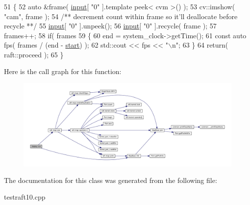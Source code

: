 \begin{DoxyCode}
51    \{
52       \textcolor{keyword}{auto} &frame( \hyperlink{classraft_1_1kernel_a6edbe35a56409d402e719b3ac36d6554}{input}[ \textcolor{stringliteral}{"0"} ].\textcolor{keyword}{template} peek< cvm >() );
53       cv::imshow( \textcolor{stringliteral}{"cam"}, frame );\textcolor{comment}{}
54 \textcolor{comment}{      /** decrement count within frame so it'll deallocate before recycle **/}
55       \hyperlink{classraft_1_1kernel_a6edbe35a56409d402e719b3ac36d6554}{input}[ \textcolor{stringliteral}{"0"} ].unpeek();
56       \hyperlink{classraft_1_1kernel_a6edbe35a56409d402e719b3ac36d6554}{input}[ \textcolor{stringliteral}{"0"} ].recycle( frame );
57       frames++;
58       \textcolor{keywordflow}{if}( frames %
59       \{
60          end = system\_clock->getTime();
61          \textcolor{keyword}{const} \textcolor{keyword}{auto} fps( frames / (end - \hyperlink{classstart}{start}) );
62          std::cout << fps << \textcolor{stringliteral}{"\(\backslash\)n"};
63       \}
64       \textcolor{keywordflow}{return}( raft::proceed );
65    \}
\end{DoxyCode}
Here is the call graph for this function\+:
\nopagebreak
\begin{figure}[H]
\begin{center}
\leavevmode
\includegraphics[width=350pt]{classdisplay_a8652ca329ee5d1650e183b17f7299b51_cgraph}
\end{center}
\end{figure}


The documentation for this class was generated from the following file\+:\begin{DoxyCompactItemize}
\item 
testraft10.\+cpp\end{DoxyCompactItemize}
